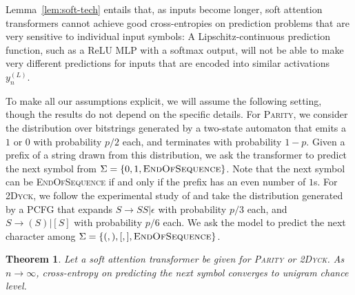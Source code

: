 \documentclass[11pt,a4paper]{article}
\newcounter{theorem}
\newtheorem{thm}[theorem]{Theorem}
\begin{document}
Lemma~\ref{lem:soft-tech} entails that, as inputs become longer, soft attention transformers cannot achieve good cross-entropies on prediction problems that are very sensitive to individual input symbols:
A Lipschitz-continuous prediction function, such as a ReLU MLP with a softmax output, will not be able to make very different predictions for inputs that are encoded into similar activations $y_n^{(L)}$.


To make all our assumptions explicit, we will assume the following setting, though the results do not depend on the specific details.
For \textsc{Parity}, we consider the distribution over bitstrings generated by a two-state automaton that emits a $1$ or $0$ with probability $p/2$ each, and terminates with probability $1-p$.
Given a prefix of a string drawn from this distribution, we ask the transformer to predict the next symbol from $\Sigma = \{0, 1, \textsc{EndOfSequence}\}$.
Note that the next symbol can be \textsc{EndOfSequence} if and only if the prefix has an even number of $1$s.
For \textsc{2Dyck}, we follow the experimental study of \citet{skachkova2018closing} and take the distribution generated by a PCFG that expands $S \rightarrow SS | \epsilon$ with probability $p/3$ each, and $S  \rightarrow (S) | [S]$ with probability $p/6$ each.
We ask the model to predict the next character among $\Sigma = \{(,),[, ], \textsc{EndOfSequence}\}$. %

\begin{thm}
Let a soft attention transformer be given for \textsc{Parity} or \textsc{2Dyck}. %
As $n\rightarrow\infty$, cross-entropy on predicting the next symbol converges to unigram chance level.
\end{thm}
\end{document}

